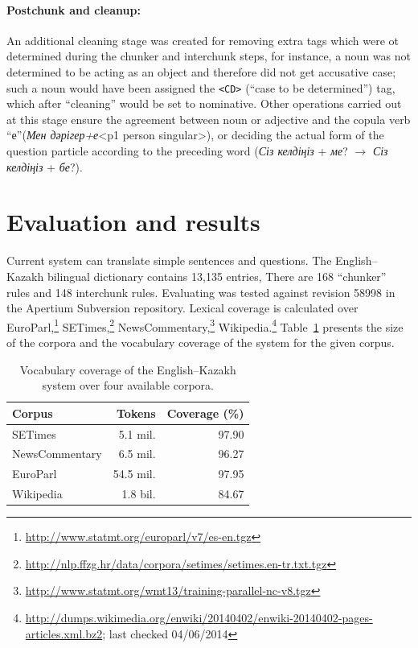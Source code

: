 \documentclass[11pt]{article}
\begin{document}
\paragraph{Postchunk and cleanup:}
An additional cleaning stage was created for removing extra tags which were ot determined during the chunker and 
interchunk steps, for instance, a noun was not determined to be acting as an object and therefore did not get accusative case; such a noun would have been assigned the  \texttt{<CD>} (``case to be determined'') tag, which after ``cleaning'' would be set to nominative. Other operations  carried out at this stage ensure
the agreement between noun or adjective and the copula verb ``е''(\emph{Мен дәрігер+е}<p1 person singular>),  or deciding the actual form of the question particle according to the preceding word (\emph{Сіз келдіңіз} + \emph{ме}? \(\to\) \emph{Сіз келдіңіз} + \emph{бе}?).

\section{Evaluation and results}

Current system can translate simple sentences and questions. The English--Kazakh bilingual dictionary 
contains 13,135 entries,  There are 168 ``chunker'' rules and 148 interchunk rules. 
Evaluating was tested against revision 58998 in the Apertium Subversion repository. Lexical coverage is calculated 
over EuroParl,\footnote{\url{http://www.statmt.org/europarl/v7/es-en.tgz}} SETimes,\footnote{\url{http://nlp.ffzg.hr/data/corpora/setimes/setimes.en-tr.txt.tgz}} NewsCommentary,\footnote{\url{http://www.statmt.org/wmt13/training-parallel-nc-v8.tgz}} Wikipedia.\footnote{\url{http://dumps.wikimedia.org/enwiki/20140402/enwiki-20140402-pages-articles.xml.bz2}; last checked 04/06/2014} 
Table~\ref{table:coverage} presents the size of the corpora and the vocabulary coverage of the system for the given corpus.

\begin{table}
  \centering
  \begin{tabular}{|l|r|r|}
    \hline
    \textbf{Corpus} & \textbf{Tokens} & \textbf{Coverage} (\%) \\
    \hline
    SETimes & 5.1 mil. & 97.90 \\
    NewsCommentary & 6.5 mil. & 96.27 \\
    EuroParl & 54.5 mil. & 97.95 \\
    Wikipedia & 1.8 bil. & 84.67 \\
    \hline
  \end{tabular}
  \caption{Vocabulary coverage of the English--Kazakh system over four available corpora.}
  \label{table:coverage}
\end{table}
\end{document}
